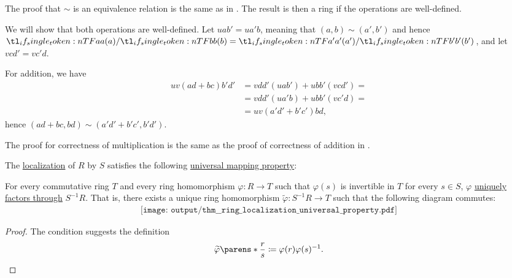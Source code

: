\begin{defproof}
  The proof that \( {\sim} \) is an equivalence relation is the same as in . The result is then a ring if the operations are well-defined.

  We will show that both operations are well-defined. Let \( u ab' = u a'b \), meaning that \( (a, b) \sim (a', b') \) and hence \( \ifrac a b = \ifrac {a'} {b'} \), and let \( v cd' = v c'd \).

  For addition, we have
  \begin{align*}
    u v (ad + bc) b' d'
    &=
    v dd' (u ab') + u bb' (v cd')
    = \\ &=
    v dd' (u a'b) + u bb' (v c'd)
    = \\ &=
    u v (a'd' + b'c') b d,
  \end{align*}
  hence \( (ad + bc, bd) \sim (a'd' + b'c', b'd') \).

  The proof for correctness of multiplication is the same as the proof of correctness of addition in .
\end{defproof}

\begin{theorem}\label{thm:ring_localization_universal_property}
  The \hyperref[def:ring_localization]{localization} of \( R \) by \( S \) satisfies the following \hyperref[rem:universal_mapping_property]{universal mapping property}:
  \begin{displayquote}
    For every commutative ring \( T \) and every ring homomorphism \( \varphi: R \to T \) such that \( \varphi(s) \) is invertible in \( T \) for every \( s \in S \), \( \varphi \) \hyperref[def:factors_through]{uniquely factors through} \( S^{-1} R \). That is, there exists a unique ring homomorphism \( \widetilde{\varphi}: S^{-1} R \to T \) such that the following diagram commutes:
    \begin{equation}\label{eq:thm:ring_localization_universal_property/diagram}
      \begin{aligned}
        \texttt{[image: output/thm\_\_ring\_localization\_universal\_property.pdf]}
      \end{aligned}
    \end{equation}
  \end{displayquote}
\end{theorem}
\begin{proof}
  The condition suggests the definition
  \begin{equation*}
    \widetilde{\varphi}\parens*{ \frac r s } \coloneqq \varphi(r) \varphi(s)^{-1}.
  \end{equation*}
\end{proof}

